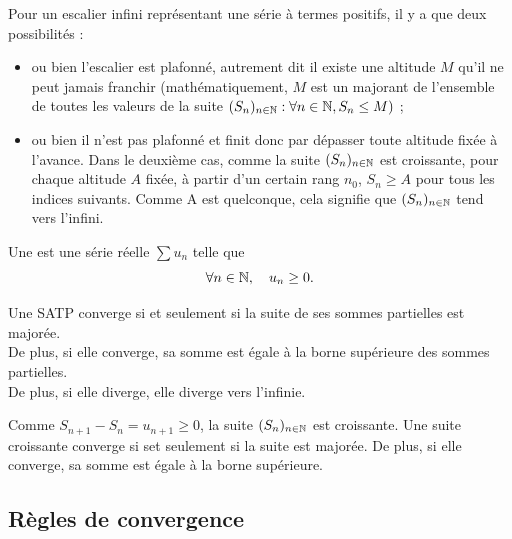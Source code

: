 \documentclass{book}
\begin{document}
Pour un escalier infini représentant une série à termes positifs, il y a que deux  possibilités :
\begin{itemize}
\item ou bien l'escalier est plafonné, autrement dit il existe une altitude $M$
qu'il ne peut jamais franchir (mathématiquement, $M$ est un majorant de l'ensemble
de toutes les valeurs de la suite $(S_n)_{n\in\mathbb{N}}:  \forall n \in \mathbb{N}, S_n \leq M)$ ;
\item ou bien il n'est pas plafonné et finit donc par dépasser toute altitude fixée à l'avance.
Dans le deuxième cas, comme la suite $(S_n)_{n\in\mathbb{N}}$ est croissante, pour chaque altitude $A$
fixée, à partir d'un certain rang $n_0$, $S_{n}\geq A$ pour tous les indices suivants.
Comme A est quelconque, cela signifie que $(S_n)_{n\in\mathbb{N}}$ tend vers l'infini.
\end{itemize}


\begin{Definition}
Une  est une série réelle $\sum u_n$ telle que $$\forall n\in\mathbb{N},\quad u_n\geq 0.$$
\end{Definition}
\begin{Proposition}
Une SATP converge si et seulement si la suite de ses sommes partielles est majorée.\\
De plus, si elle converge, sa somme est égale à la borne supérieure
des sommes partielles.\\
De plus, si elle diverge, elle diverge vers l'infinie. 
\end{Proposition}
\begin{Demonstration}
Comme $S_{n+1}-S_n=u_{n+1}\geq 0$, la suite $(S_n)_{n\in\mathbb{N}}$ est croissante. Une suite croissante converge si set seulement si la suite est majorée. De plus, si elle converge, sa somme est égale à la borne supérieure.
\end{Demonstration}

\subsection{Règles de convergence}
\end{document}
